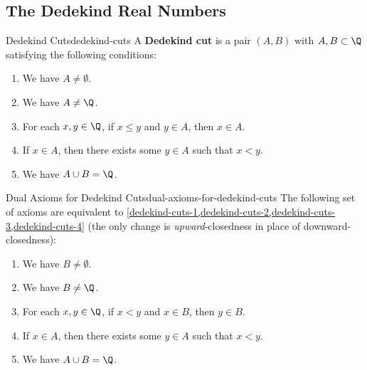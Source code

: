 \subsection{The Dedekind Real Numbers}\label{subsection-the-dedekind-real-numbers}
\begin{definition}{Dedekind Cuts}{dedekind-cuts}%
    A \textbf{Dedekind cut} is a pair $(A,B)$ with $A,B\subset\Q$ satisfying the following conditions:
    \begin{enumerate}
        \item\label{dedekind-cuts-1}We have $A\neq\emptyset$.
        \item\label{dedekind-cuts-2}We have $A\neq\Q$.
        \item\label{dedekind-cuts-3}For each $x,y\in\Q$, if $x\leq y$ and $y\in A$, then $x\in A$.
        \item\label{dedekind-cuts-4}If $x\in A$, then there exists some $y\in A$ such that $x\lt y$.
        \item\label{dedekind-cuts-5}We have $A\cup B=\Q$.
    \end{enumerate}
\end{definition}
\begin{remark}{Dual Axioms for Dedekind Cuts}{dual-axioms-for-dedekind-cuts}%
    The following set of axioms are equivalent to \cref{dedekind-cuts-1,dedekind-cuts-2,dedekind-cuts-3,dedekind-cuts-4} (the only change is \textit{upward}-closedness in place of downward-closedness):
    \begin{enumerate}
        \item\label{dual-axioms-for-dedekind-cuts-1}We have $B\neq\emptyset$.
        \item\label{dual-axioms-for-dedekind-cuts-2}We have $B\neq\Q$.
        \item\label{dual-axioms-for-dedekind-cuts-3}For each $x,y\in\Q$, if $x\lt y$ and $x\in B$, then $y\in B$.
        \item\label{dual-axioms-for-dedekind-cuts-4}If $x\in A$, then there exists some $y\in A$ such that $x\lt y$.
        \item\label{dual-axioms-for-dedekind-cuts-5}We have $A\cup B=\Q$.
    \end{enumerate}
\end{remark}
